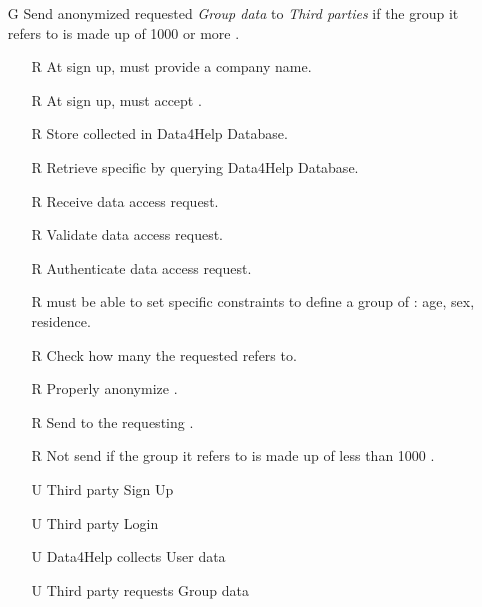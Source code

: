 \documentclass[../../../rasd.tex]{subfiles}
\begin{document}
\begin{itemize}
	\item[G\subs{3}]Send anonymized requested \textit{Group data} to \textit{Third parties} if the group it refers to is made up of 1000 or more .
	\begin{itemize}
		\item[R\subs{3}]At sign up,  must provide a company name.
		\item[R\subs{5}]At sign up,  must accept .
		\item[R\subs{11}]Store collected  in Data4Help Database.
		\item[R\subs{12}]Retrieve specific  by querying Data4Help Database.
		\item[R\subs{13}]Receive  data access request.
		\item[R\subs{14}]Validate  data access request.
		\item[R\subs{15}]Authenticate  data access request.
		\item[R\subs{21}] must be able to set specific constraints to define a group of : age, sex, residence.
		\item[R\subs{22}]Check how many  the requested  refers to.
		\item[R\subs{23}]Properly anonymize .
		\item[R\subs{24}]Send  to the requesting .
		\item[R\subs{25}]Not send  if the group it refers to is made up of less than 1000 .
		\\
		\item[U\subs{2}]Third party Sign Up
		\item[U\subs{4}]Third party Login
		\item[U\subs{5}]Data4Help collects User data
		\item[U\subs{7}]Third party requests Group data
	\end{itemize}


\end{itemize}
\end{document}
